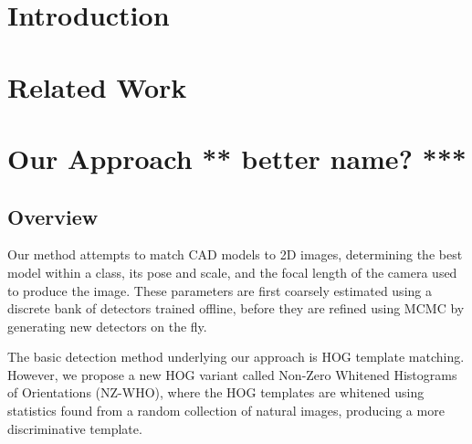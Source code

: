 \documentclass[10pt,twocolumn,letterpaper]{article}
\newcommand{\scream}[1]{{\color{red} \bf *** #1 ***}}
\begin{document}
\begin{abstract}

\end{abstract}

\section{Introduction}
\label{sec:intro}

%
\section{Related Work}
\label{sec:related}



\section{Our Approach \scream{better name?}}
\label{sec:nz-who}

\subsection{Overview}
Our method attempts to match CAD models to 2D images, determining the best model within a class, its pose and scale, and the focal length of the camera used to produce the image. These parameters are first coarsely estimated using a discrete bank of detectors trained offline, before they are refined using MCMC by generating new detectors on the fly.

The basic detection method underlying our approach is HOG template matching. However, we propose a new HOG variant called Non-Zero Whitened Histograms of Orientations (NZ-WHO), where the HOG templates are whitened using statistics found from a random collection of natural images, producing a more discriminative template.
\end{document}

